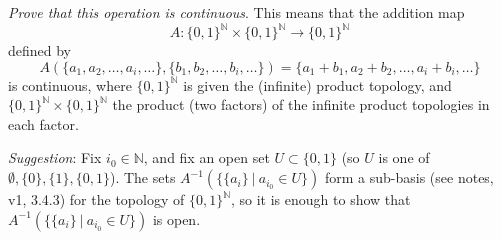 \documentclass{jhwhw}
\newcommand{\N}{{\mathbb N}}
\begin{document}
\emph{ Prove that this operation is continuous}. This means that the  addition  map
$$
A: \{0,1\}^\N\times\{0,1\}^\N \to \{0,1\}^\N 
$$
defined by
$$
A(\{a_1,a_2,\dots, a_i,\dots  \},\{b_1,b_2,\dots, b_i,\dots\})  = \{a_1 + b_1, a_2+b_2,\dots , a_i +b_i,\dots \}
$$
is continuous, where $\{0,1\}^\N$ is given the (infinite) product topology, and $\{0,1\}^\N\times\{0,1\}^\N$ the product (two factors) of the infinite product topologies in each factor.

\emph{Suggestion}:  Fix $i_0\in\N$, and  fix an open set $U\subset \{0,1\}$ (so  $U $ is one of $\emptyset, \{0\}, \{1\},\{0,1\}$).  The sets $A^{-1}(\{ \{a_i\} \ | \ a_{i_0}\in U\})$ form a sub-basis (see notes, v1,  3.4.3)  for the topology of $\{0,1\}^\N$, so it is enough to show that $A^{-1}(\{ \{a_i\} \ | \ a_{i_0}\in U\})$ is open.

\solution{}
\end{document}
